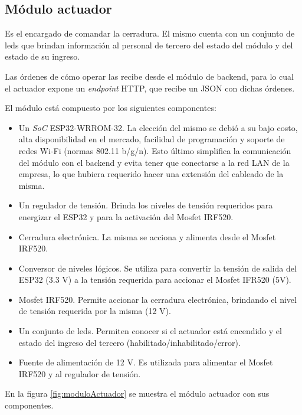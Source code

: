 \subsection{Módulo actuador}

Es el encargado de comandar la cerradura. El mismo cuenta con un conjunto de leds que brindan información al personal de tercero del estado del módulo y del estado de su ingreso.

Las órdenes de cómo operar las recibe desde el módulo de backend, para lo cual el actuador expone un \textit{endpoint} HTTP, que recibe un JSON con dichas órdenes.

\pagebreak
El módulo está compuesto por los siguientes componentes:

\begin{itemize}
\item Un \textit{SoC} ESP32-WRROM-32. La elección del mismo se debió a su bajo costo, alta disponibilidad en el mercado, facilidad de programación y soporte de redes Wi-Fi (normas 802.11 b/g/n). Esto último simplifica la comunicación del módulo con el backend y evita tener que conectarse a la red LAN de la empresa, lo que hubiera requerido hacer una extensión del cableado de la misma.
\item Un regulador de tensión. Brinda los niveles de tensión requeridos para energizar el ESP32 y para la activación del Mosfet IRF520. 
\item Cerradura electrónica. La misma se acciona y alimenta desde el Mosfet IRF520.
\item Conversor de niveles lógicos. Se utiliza para convertir la tensión de salida del ESP32 (3.3 V) a la tensión requerida para accionar el Mosfet IFR520 (5V).
\item Mosfet IRF520. Permite accionar la cerradura electrónica, brindando el nivel de tensión requerida por la misma (12 V).
\item Un conjunto de leds. Permiten conocer si el actuador está encendido y el estado del ingreso del tercero (habilitado/inhabilitado/error).
\item Fuente de alimentación de 12 V. Es utilizada para alimentar el  Mosfet IRF520 y al regulador de tensión.
\end{itemize}

En la figura \ref{fig:moduloActuador} se muestra el módulo actuador con sus componentes.

